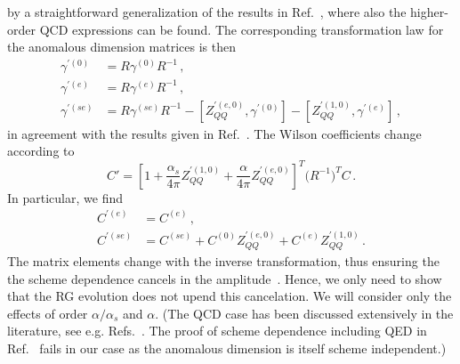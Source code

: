 \documentclass[letter,11pt,DIV=12,abstract=true,numbers=noenddot,titlepage=false,twocolumn=false,draft=false]{scrartcl}
\begin{document}
by a straightforward generalization of the results in
Ref.~\cite{Brod:2010mj}, where also the higher-order QCD expressions
can be found. The corresponding transformation law for the anomalous
dimension matrices is then
\begin{align}\label{eq:admtrafo}
\gamma^{\prime(0)} &= R\gamma^{(0)}R^{-1} \,,\\
\gamma^{\prime(e)} &= R\gamma^{(e)}R^{-1} \,,\\
\gamma^{\prime(se)} &= R\gamma^{(se)}R^{-1}
                - \left[Z_{QQ}^{\prime(e,0)},\gamma^{\prime(0)} \right]
                - \left[Z_{QQ}^{\prime(1,0)},\gamma^{\prime(e)} \right] \,,
\end{align}
in agreement with the results given in Ref.~\cite{Buras:1993dy}. The
Wilson coefficients change according to
\begin{equation}\label{eq:cprime}
  C' = \left [ 1 + \frac{\alpha_s }{4 \pi} Z^{\prime(1,0)}_{QQ}
                      + \frac{\alpha}{4 \pi} Z^{\prime(e,0)}_{QQ}
            \right ]^T \! \! ( R^{-1} \big )^T C \,.
\end{equation} 
In particular, we find
\begin{align}
  C^{\prime(e)}  & = C^{(e)} \,, \\
  C^{\prime(se)} & = C^{(se)} + C^{(0)} Z^{\prime(e,0)}_{QQ} + C^{(e)} Z^{\prime(1,0)}_{QQ} \,.
\end{align} 
The matrix elements change with the inverse transformation, thus
ensuring the the scheme dependence cancels in the
amplitude~\cite{Brod:2010mj}. Hence, we only need to show that the RG
evolution does not upend this cancelation. We will consider only the
effects of order $\alpha/\alpha_s$ and $\alpha$. (The QCD case has
been discussed extensively in the literature, see
e.g. Refs.~\cite{Buras:1991jm, Herrlich:1994kh, Gorbahn:2004my}. The
proof of scheme dependence including QED in Ref.~\cite{Buras:1993dy}
fails in our case as the anomalous dimension is itself scheme
independent.)
\end{document}
